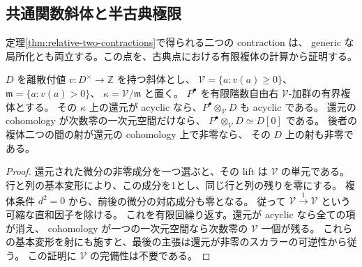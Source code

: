 \subsection{共通関数斜体と半古典極限}
\label{subsec:relative-common-generic}

定理\ref{thm:relative-two-contractions}で得られる二つの contraction は、
generic な局所化とも両立する。この点を、古典点における有限複体の計算から証明する。

\begin{lemma}\label{lem:valued-complex-cancellation}
$D$ を離散付値 $v:D^\times\to\mathbb Z$ を持つ斜体とし、
$\mathcal V=\{a:v(a)\geq0\}$、$\mathfrak m=\{a:v(a)>0\}$、
$\kappa=\mathcal V/\mathfrak m$ と置く。
$P^\bullet$ を有限階数自由右 $\mathcal V$-加群の有界複体とする。
その $\kappa$ 上の還元が acyclic なら、$P^\bullet\otimes_{\mathcal V}D$ も acyclic である。
還元の cohomology が次数零の一次元空間だけなら、
$P^\bullet\otimes_{\mathcal V}D\simeq D[0]$ である。
後者の複体二つの間の射が還元の cohomology 上で非零なら、
その $D$ 上の射も非零である。
\end{lemma}
\begin{proof}
還元された微分の非零成分を一つ選ぶと、その lift は $\mathcal V$ の単元である。
行と列の基本変形により、この成分を1とし、同じ行と列の残りを零にする。
複体条件 $d^2=0$ から、前後の微分の対応成分も零となる。
従って $\mathcal V\xrightarrow{1}\mathcal V$ という可縮な直和因子を除ける。
これを有限回繰り返す。還元が acyclic なら全ての項が消え、
cohomology が一つの一次元空間なら次数零の $\mathcal V$ 一個が残る。
これらの基本変形を射にも施すと、最後の主張は還元が非零のスカラーの可逆性から従う。
この証明に $\mathcal V$ の完備性は不要である。
\end{proof}


